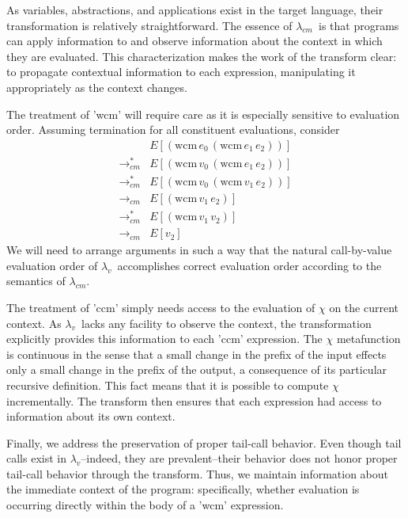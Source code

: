 \documentclass{llncs}
\newcommand{\cm}[0]{$\lambda_{cm}$}
\newcommand{\lv}[0]{$\lambda_v$}
\newcommand{\wcm}[2]{(\mathrm{wcm}\,#1\,#2)}
\newcommand{\cmrr}[0]{\rightarrow_{cm}}
\newcommand{\cmrrs}[0]{\rightarrow_{cm}^{*}}
\begin{document}



As variables, abstractions, and applications exist in the target language, their transformation is relatively straightforward. The essence of \cm\ is that programs can apply information to and observe information about the context in which they are evaluated. This characterization makes the work of the transform clear: to propagate contextual information to each expression, manipulating it appropriately as the context changes.

The treatment of \scheme'wcm' will require care as it is especially sensitive to evaluation order. Assuming termination for all constituent evaluations, consider
\begin{align*}
       &E[\wcm{e_0}{\wcm{e_1}{e_2}}]\\
\cmrrs &E[\wcm{v_0}{\wcm{e_1}{e_2}}]\\
\cmrrs &E[\wcm{v_0}{\wcm{v_1}{e_2}}]\\
\cmrr  &E[\wcm{v_1}{e_2}]\\
\cmrrs &E[\wcm{v_1}{v_2}]\\
\cmrr  &E[v_2]
\end{align*}
We will need to arrange arguments in such a way that the natural call-by-value evaluation order of \lv\ accomplishes correct evaluation order according to the semantics of \cm.

The treatment of \scheme'ccm' simply needs access to the evaluation of $\chi$ on the current context. As \lv\ lacks any facility to observe the context, the transformation explicitly provides this information to each \scheme'ccm' expression. The $\chi$ metafunction is continuous in the sense that a small change in the prefix of the input effects only a small change in the prefix of the output, a consequence of its particular recursive definition. This fact means that it is possible to compute $\chi$ incrementally. The transform then ensures that each expression had access to information about its own context.

Finally, we address the preservation of proper tail-call behavior. Even though tail calls exist in \lv--indeed, they are prevalent--their behavior does not honor proper tail-call behavior through the transform. Thus, we maintain information about the immediate context of the program: specifically, whether evaluation is occurring directly within the body of a \scheme'wcm' expression.
\end{document}
